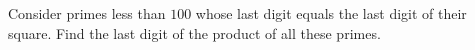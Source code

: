 Consider primes less than $100$ whose last digit equals the last digit of their square. Find the last digit of the product of all these primes.
